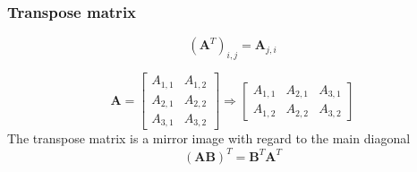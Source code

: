 \documentclass[notes]{beamer}          %
\newcommand{\vect}[1]{\bm{#1}}
\newcommand{\field}[1]{\mathbb{#1}}
\newcommand{\R}{\field{R}}
\newif\iffull
\begin{document}
\begin{frame}
\frametitle{Transpose matrix}
         $$(\vect{A}^T)_{i,j} = \vect{A}_{j,i}$$

        $$ \vect{A} = \begin{bmatrix}
                        A_{1,1} & A_{1,2}  \\
                        A_{2,1} & A_{2,2}  \\
                        A_{3,1} & A_{3,2}
                      \end{bmatrix} \Rightarrow
                      \begin{bmatrix}
                        A_{1,1} & A_{2,1} & A_{3,1} \\
                        A_{1,2} & A_{2,2} & A_{3,2}
                      \end{bmatrix}
                      $$
        The transpose matrix is a mirror image with regard to the main diagonal \\
        $$(\vect{A}\vect{B})^T = \vect{B}^T\vect{A}^T$$

\end{frame}

\iffull
\begin{frame}
\frametitle{Identity matrix}
    \begin{itemize}
        \item Identity matrix $\vect{I}_3$
        $$\begin{bmatrix}
            1 & 0 & 0 \\
            0 & 1 & 0 \\
            0 & 0 & 1
          \end{bmatrix}$$

        \item The identity matrices are neutral elements in matrix-matrix and matrix-vector multiplication, e.g.
        $$\forall \vect{x} \in \R^n: \vect{I}_n \vect{x} = \vect{x} \vect{I}_n = \vect{x} $$
    \end{itemize}

\end{frame}
\fi
\end{document}
